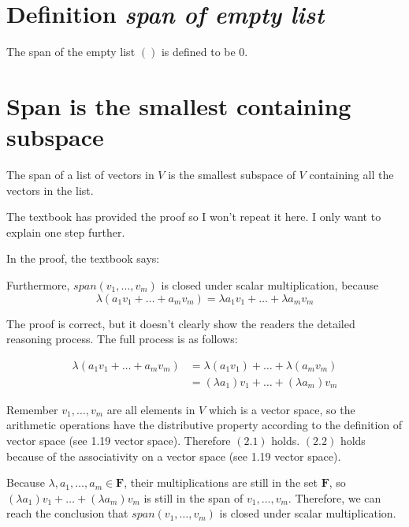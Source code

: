 \documentclass[12pt, letterpaper, oneside]{book}
\begin{document}
\section{Definition \textbf{\textit{span of empty list}}}

The span of the empty list $()$ is defined to be ${0}$.

\section{Span is the smallest containing subspace}

The span of a list of vectors in $V$ is the smallest subspace of $V$ containing
all the vectors in the list.

The textbook has provided the proof so I won't repeat it here. I only want to
explain one step further.

In the proof, the textbook says:

\begin{displayquote}
  Furthermore, $span(v_1, \ldots, v_m)$ is closed under scalar multiplication,
  because
  \[
    \lambda(a_1v_1 + \dots + a_mv_m) = \lambda a_1v_1 + \dots + \lambda a_mv_m
  \]
\end{displayquote}

The proof is correct, but it doesn't clearly show the readers the detailed
reasoning process. The full process is as follows:

\begin{align}
  \lambda(a_1v_1 + \dots + a_mv_m)
    & = \lambda(a_1v_1) + \dots + \lambda (a_mv_m) \\
    & = (\lambda a_1)v_1 + \dots + (\lambda a_m)v_m
\end{align}

Remember $v_1, \ldots, v_m$ are all elements in $V$ which is a vector space,
so the arithmetic operations have the distributive property according to the
definition of vector space (see 1.19 vector space). Therefore $(2.1)$ holds.
$(2.2)$ holds because of the associativity on a vector space (see 1.19 vector
space).

Because $\lambda, a_1, \ldots, a_m \in \mathbf{F}$, their multiplications are
still in the set $\mathbf{F}$, so $(\lambda a_1)v_1 + \dots + (\lambda a_m)v_m$
is still in the span of $v_1, \ldots, v_m$. Therefore, we can reach the
conclusion that $span(v_1, \ldots, v_m)$ is closed under scalar multiplication.
\end{document}
